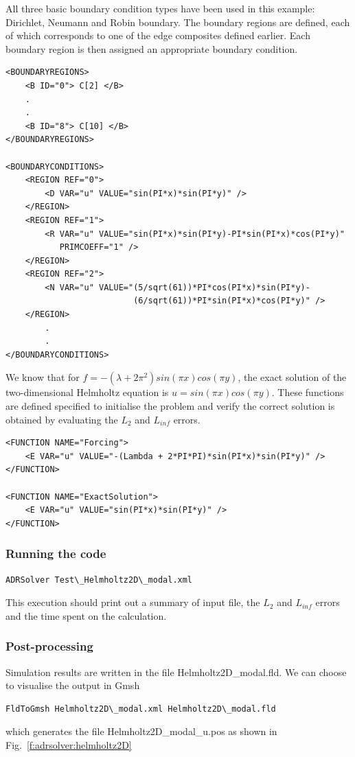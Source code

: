 All three basic boundary condition types have been used in this example:
Dirichlet, Neumann and Robin boundary. The boundary regions are defined, each of
which corresponds to one of the edge composites defined earlier. Each boundary
region is then assigned an appropriate boundary condition.
\begin{lstlisting}[style=XMLStyle]
<BOUNDARYREGIONS>
    <B ID="0"> C[2] </B>
    .
    .
    <B ID="8"> C[10] </B>
</BOUNDARYREGIONS>

<BOUNDARYCONDITIONS>
    <REGION REF="0">
        <D VAR="u" VALUE="sin(PI*x)*sin(PI*y)" />
    </REGION>
    <REGION REF="1">
        <R VAR="u" VALUE="sin(PI*x)*sin(PI*y)-PI*sin(PI*x)*cos(PI*y)" 
           PRIMCOEFF="1" />
    </REGION>
    <REGION REF="2">
        <N VAR="u" VALUE="(5/sqrt(61))*PI*cos(PI*x)*sin(PI*y)-
                          (6/sqrt(61))*PI*sin(PI*x)*cos(PI*y)" />
    </REGION>
        .
        .
</BOUNDARYCONDITIONS>
\end{lstlisting}

We know that for $f = -(\lambda + 2 \pi^2)sin(\pi x)cos(\pi y)$, the exact 
solution of the two-dimensional Helmholtz equation is $u = sin(\pi x)cos(\pi
y)$. These functions are defined specified to initialise the problem and verify
the correct solution is obtained by evaluating the $L_2$ and $L_{inf}$ errors.
\begin{lstlisting}[style=XMLStyle]
<FUNCTION NAME="Forcing">
    <E VAR="u" VALUE="-(Lambda + 2*PI*PI)*sin(PI*x)*sin(PI*y)" />
</FUNCTION>

<FUNCTION NAME="ExactSolution">
    <E VAR="u" VALUE="sin(PI*x)*sin(PI*y)" />
</FUNCTION>
\end{lstlisting}


\subsubsection{Running the code}
\begin{lstlisting}[style=BashInputStyle]
ADRSolver Test\_Helmholtz2D\_modal.xml
\end{lstlisting}

This execution should print out a summary of input file, the $L_2$ and 
$L_{inf}$ errors and the time spent on the calculation.

\subsubsection{Post-processing}
Simulation results are written in the file Helmholtz2D\_modal.fld. We can choose
to visualise the output in Gmsh
\begin{lstlisting}[style=BashInputStyle]
FldToGmsh Helmholtz2D\_modal.xml Helmholtz2D\_modal.fld
\end{lstlisting}
which generates the file Helmholtz2D\_modal\_u.pos as shown in
Fig.~\ref{f:adrsolver:helmholtz2D}

